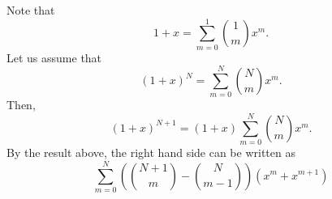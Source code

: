 Note that 
%
\begin{equation}
1 + x = \sum_{m = 0}^{1} {1 \choose m} x ^ m.
\end{equation}
%
Let us assume that 
%
\begin{equation}
(1 + x) ^ N = \sum_{m = 0}^{N} {N \choose m} x ^ m.
\end{equation}
%
Then,
%
\begin{equation}
(1 + x) ^ {N + 1} = (1 + x) \sum_{m = 0}^{N} {N \choose m} x ^ m.
\end{equation}
%
By the result above, the right hand side can be written as
%
\begin{equation}
\sum_{m = 0}^{N} \left( {N + 1 \choose m} - {N \choose m - 1} \right)  \left( x ^ m + x ^ {m + 1} \right)
\end{equation}
%



































